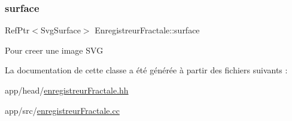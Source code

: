 \subsubsection{\texorpdfstring{surface}{surface}}
{\footnotesize\ttfamily Ref\+Ptr$<$Svg\+Surface$>$ Enregistreur\+Fractale\+::surface\hspace{0.3cm}{\ttfamily [private]}}

Pour creer une image S\+VG 

La documentation de cette classe a été générée à partir des fichiers suivants \+:\begin{DoxyCompactItemize}
\item 
app/head/\hyperlink{enregistreurFractale_8hh}{enregistreur\+Fractale.\+hh}\item 
app/src/\hyperlink{enregistreurFractale_8cc}{enregistreur\+Fractale.\+cc}\end{DoxyCompactItemize}
